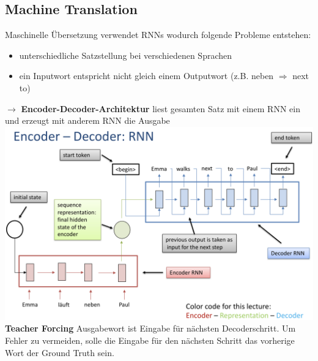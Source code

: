 \documentclass[12pt]{article}
\begin{document}
	\subsection{Machine Translation}
	Maschinelle Übersetzung verwendet RNNs wodurch folgende Probleme entstehen:
	\begin{itemize}
		\item unterschiedliche Satzstellung bei verschiedenen Sprachen
		\item ein Inputwort entspricht nicht gleich einem Outputwort (z.B. neben $\Rightarrow$ next to)
	\end{itemize}
	$\rightarrow$ \textbf{Encoder-Decoder-Architektur} liest gesamten Satz mit einem RNN ein und erzeugt mit anderem RNN die Ausgabe\\
	\includegraphics[width=\linewidth]{figures/encoder-decoder-rnn.png}\\
	\textbf{Teacher Forcing} Ausgabewort ist Eingabe für nächsten Decoderschritt. Um Fehler zu vermeiden, solle die Eingabe für den nächsten Schritt das vorherige Wort der Ground Truth sein.

\end{document}
